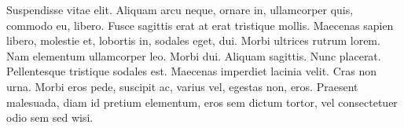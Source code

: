 \documentclass[12pt,twocolumn,twoside]{article}
\begin{document}
Suspendisse vitae elit. Aliquam arcu neque, ornare in, ullamcorper quis,
commodo eu, libero. Fusce sagittis erat at erat tristique mollis. Maecenas
sapien libero, molestie et, lobortis in, sodales eget, dui. Morbi ultrices rutrum
lorem. Nam elementum ullamcorper leo. Morbi dui. Aliquam sagittis. Nunc
placerat. Pellentesque tristique sodales est. Maecenas imperdiet lacinia velit.
Cras non urna. Morbi eros pede, suscipit ac, varius vel, egestas non, eros.
Praesent malesuada, diam id pretium elementum, eros sem dictum tortor,
vel consectetuer odio sem sed wisi.
\tableofcontents
\end{document}
